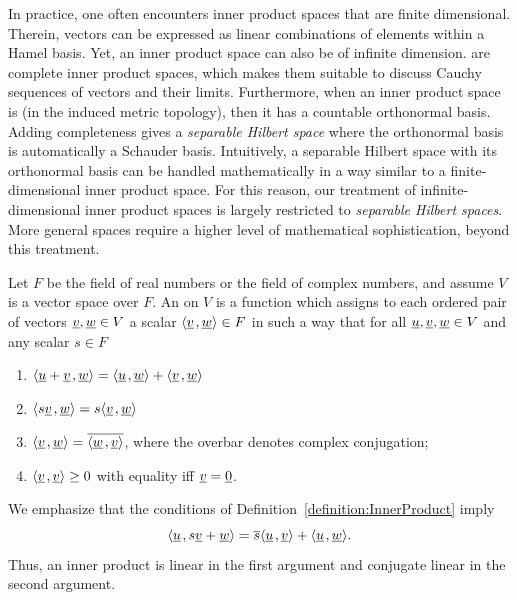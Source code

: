 In practice, one often encounters inner product spaces that are finite dimensional.
Therein, vectors can be expressed as linear combinations of elements within a Hamel basis. 
Yet, an inner product space can also be of infinite dimension.
 are complete inner product spaces, which makes them suitable to discuss Cauchy sequences of vectors and their limits.
Furthermore, when an inner product space is  (in the induced metric topology), then it has a countable orthonormal basis.
Adding completeness gives a \emph{separable Hilbert space} where the orthonormal basis is automatically a Schauder basis.
Intuitively, a separable Hilbert space with its orthonormal basis can be handled mathematically in a way similar to a finite-dimensional inner product space.
For this reason, our treatment of infinite-dimensional inner product spaces is largely restricted to \emph{separable Hilbert spaces}.
More general spaces require a higher level of mathematical sophistication, beyond this treatment.

\begin{definition} \label{definition:InnerProduct}
Let $F$ be the field of real numbers or the field of complex numbers, and assume $V$ is a vector space over $F$.
An  on $V$ is a function which assigns to each ordered pair of vectors $\underline{v}, \underline{w} \in V$ a scalar ${\left\langle  \underline{v}  \mskip2mu ,  \underline{w}  \right\rangle} \in F$ in such a way that for all $\underline{u}, \underline{v}, \underline{w} \in V$ and any scalar $s \in F$
\begin{enumerate}
\item ${\left\langle  \underline{u} + \underline{v}  \mskip2mu ,  \underline{w}  \right\rangle}
= {\left\langle  \underline{u}  \mskip2mu ,  \underline{w}  \right\rangle}
+ {\left\langle  \underline{v}  \mskip2mu ,  \underline{w}  \right\rangle}$
\item ${\left\langle  s \underline{v}  \mskip2mu ,  \underline{w}  \right\rangle}
= s {\left\langle  \underline{v}  \mskip2mu ,  \underline{w}  \right\rangle}$
\item ${\left\langle  \underline{v}  \mskip2mu ,  \underline{w}  \right\rangle}
= \overline{ {\left\langle  \underline{w}  \mskip2mu ,  \underline{v}  \right\rangle} }$, where the overbar denotes complex conjugation;
\item ${\left\langle  \underline{v}  \mskip2mu ,  \underline{v}  \right\rangle} \geq 0$ with equality iff $\underline{v} = \underline{0}$.
\end{enumerate}
\end{definition}

We emphasize that the conditions of Definition~\ref{definition:InnerProduct} imply
\begin{equation*}
{\left\langle  \underline{u}  \mskip2mu ,  s \underline{v} + \underline{w}  \right\rangle}
= \overline{s} {\left\langle  \underline{u}  \mskip2mu ,  \underline{v}  \right\rangle}
+ {\left\langle  \underline{u}  \mskip2mu ,  \underline{w}  \right\rangle} .
\end{equation*}
Thus, an inner product is linear in the first argument and conjugate linear in the second argument.

